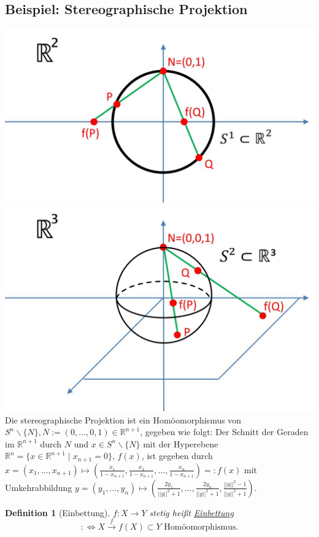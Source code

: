 \documentclass[a4paper,11pt,notitlepage]{report}
\newtheorem{definition}{Definition}[chapter]
\newcommand{\R}{{\ensuremath{\mathbb{R}}}}
\newenvironment{bsp}[1]
{
\setlength{\fboxsep}{10pt}
\subsection*{Beispiel: #1}
\begin{upshape}
}
{
\end{upshape}
}
\begin{document}
\begin{bsp}{Stereographische Projektion}
	\includegraphics[scale=0.35]{images/Stereographie_S1_R1.jpg}
	\includegraphics[scale=0.35]{images/Stereographie_S2_R2.jpg}
	\newline
	Die stereographische Projektion ist ein Homöomorphismus von $S^n \backslash \{N\}, N := (0, \ldots, 0, 1) \in \R^{n+1}$, gegeben wie folgt:
	\newline
	Der Schnitt der Geraden im $\R^{n+1}$ durch $N$ und $x \in S^n \backslash \{N\}$ mit der Hyperebene $\R^n=\{x \in \R^{n+1} \mid x_{n+1} = 0 \}$, $f(x)$, ist gegeben durch $x = (x_1, \ldots, x_{n+1}) \mapsto (\frac{x_1}{1-x_{n+1}}, \frac{x_2}{1-x_{n+1}}, \ldots, \frac{x_n}{1-x_{n+1}}) =: f(x)$ mit Umkehrabbildung $y = (y_1, \ldots, y_n) \mapsto (\frac{2 y_1}{||y||^2+1}, \ldots, \frac{2 y_n}{||y||^2+1},\frac{||y||^2-1}{||y||^2+1})$.
\end{bsp}

\begin{definition}[Einbettung]
	$f \colon X \rightarrow Y$ stetig heißt \underline{Einbettung} $$:\Leftrightarrow X \overset{f}{\rightarrow}f(X) \subset Y \text{ Homöomorphismus.}$$
\end{definition}
\end{document}
